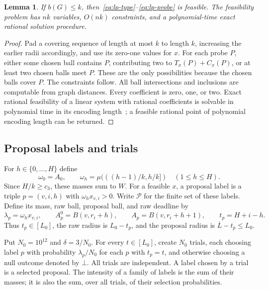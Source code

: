 \documentclass[11pt]{article}
\numberwithin{equation}{section}
\newtheorem{lemma}[theorem]{Lemma}
\theoremstyle{definition}
\newcommand{\cL}{\overline L}
\begin{document}
\begin{lemma}\label{lem:lp-validity}
If $b(G)\le k$, then~\eqref{eq:lp-type}--\eqref{eq:lp-probe} is
feasible. The feasibility problem has $nk$ variables, $O(nk)$
constraints, and a polynomial-time exact rational solution procedure.
\end{lemma}
\begin{proof}
Pad a covering sequence of length at most $k$ to length $k$, increasing
the earlier radii accordingly, and use its zero-one values for $x$.
For each probe $P$, either some chosen ball contains $P$, contributing
two to $T_x(P)+C_x(P)$, or at least two chosen balls meet $P$. These are
the only possibilities because the chosen balls cover $P$.
The constraints follow.
All ball intersections and inclusions are computable from graph distances.
Every coefficient is zero, one, or two. Exact rational feasibility of a
linear system with rational coefficients is solvable in polynomial time
in its encoding length~\cite{Khachiyan}; a feasible rational point of
polynomial encoding length can be returned.
\end{proof}

\subsection{Proposal labels and trials}

For $h\in\{0,\ldots,H\}$ define
\begin{equation}\label{eq:discrete-masses}
 \omega_0=A_0,\qquad
 \omega_h=\mu(((h-1)/k,h/k])\quad(1\le h\le H).
\end{equation}
Since $H/k\ge c_3$, these masses sum to $W$.
For a feasible $x$, a proposal label is a triple $p=(v,i,h)$ with
$\omega_hx_{v,i}>0$. Write $\mathcal P$ for the finite set of these labels.
Define its mass, raw ball, proposal ball, and raw
deadline by
\begin{equation}\label{eq:proposal-label}
 \lambda_p=\omega_hx_{v,i},\qquad
 A_p^0=B(v,r_i+h),\qquad A_p=B(v,r_i+h+1),\qquad
 t_p=H+i-h.
\end{equation}
Thus $t_p\in[L_0]$, the raw radius is $L_0-t_p$, and the proposal
radius is $\cL-t_p\le L_0$.

Put $N_0=10^{12}$ and $\delta=3/N_0$. For every $t\in[L_0]$, create
$N_0$ trials, each choosing label $p$ with probability $\lambda_p/N_0$
for each $p$ with $t_p=t$, and otherwise choosing a null outcome denoted
by $\bot$. All trials are independent. A label chosen by a trial is a
selected proposal. The intensity of a family of labels is the sum of
their masses; it is also the sum, over all trials, of their selection
probabilities.
\end{document}

